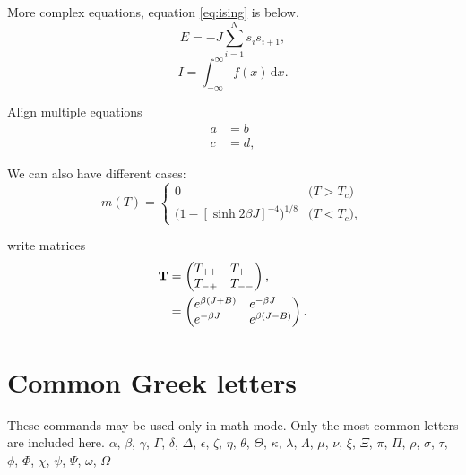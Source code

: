\documentclass[
    10pt,aps,prl,
    amsfonts,
    amssymb,
    amsmath,
    draft,
    runinaddress,
    secnum,
    showkeys,
    superscriptaddress,
    twocolumn,
]{revtex4}
\begin{document}
More complex equations, equation \ref{eq:ising} is below.
\begin{equation}
    \label{eq:ising}
    E = -J \sum_{i=1}^N s_i s_{i+1},
\end{equation}
\begin{equation}
    I = \! \int_{-\infty}^\infty f(x)\,\mathrm{d}x \label{eq:fine}.
\end{equation}

Align multiple equations
\begin{align}
    a & = b \\
    c &= d,
\end{align}

We can also have different cases:
\begin{equation}
\label{eq:mdiv}
m(T) =
\begin{cases}
0 & \text{($T > T_c$)} \\
\big(1 - [\sinh 2 \beta J]^{-4} \big)^{\! 1/8} & \text{($T < T_c$)},
\end{cases}
\end{equation}

write matrices
\begin{align}
\textbf{T} &=
\begin{pmatrix}
T_{++} \hfill & T_{+-} \\
T_{-+} & T_{--} \hfill 
\end{pmatrix}, \nonumber \\
& =
\begin{pmatrix}
e^{\beta (J + B)} \hfill & e^{-\beta J} \hfill \\
e^{-\beta J} \hfill & e^{\beta (J - B)} \hfill
\end{pmatrix}.
\end{align}

\section{Common Greek letters}

These commands may be used only in math mode. 
Only the most common letters are included here.
$\alpha$, $\beta$, $\gamma$, $\Gamma$, $\delta$, $\Delta$, $\epsilon$, $\zeta$, $\eta$, $\theta$, $\Theta$, $\kappa$, $\lambda$, $\Lambda$, $\mu$, $\nu$, $\xi$, $\Xi$, $\pi$, $\Pi$, $\rho$, $\sigma$, $\tau$, $\phi$, $\Phi$, $\chi$, $\psi$, $\Psi$, $\omega$, $\Omega$
\end{document}
